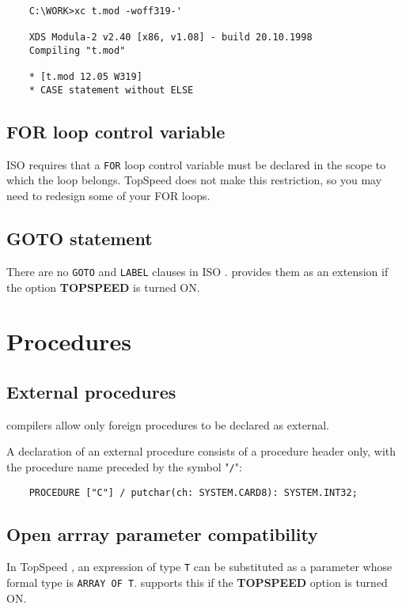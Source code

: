 \begin{verbatim}
    C:\WORK>xc t.mod -woff319-'

    XDS Modula-2 v2.40 [x86, v1.08] - build 20.10.1998
    Compiling "t.mod"

    * [t.mod 12.05 W319]
    * CASE statement without ELSE
\end{verbatim}

\subsection{FOR loop control variable}

    ISO \mt{} requires that a \verb'FOR' loop control variable must be declared
    in the scope to which the loop belongs. TopSpeed does not make this
    restriction, so you may need to redesign some of your FOR loops.

\subsection{GOTO statement}

    There are no \verb'GOTO' and \verb'LABEL' clauses in ISO \mt{}. \XDS{}
    provides them as an extension if the option {\bf TOPSPEED} is turned ON.

\section{Procedures}

\subsection{External procedures}

     \xds{} compilers allow only foreign procedures to be declared as 
     external.

     A declaration of an external procedure consists of a procedure header 
     only, with the procedure name preceded by the symbol "\verb'/'":

     \verb'    PROCEDURE ["C"] / putchar(ch: SYSTEM.CARD8): SYSTEM.INT32;'

\subsection{Open arrray parameter compatibility}

    In TopSpeed \mt{}, an expression of type \verb'T' can be substituted as 
    a parameter whose formal type is \verb'ARRAY OF T'. \xds{} supports 
    this if the {\bf TOPSPEED} option is turned ON.

